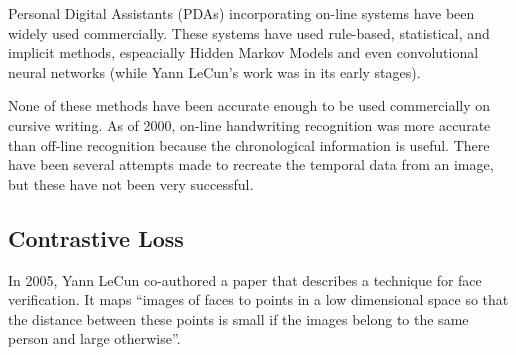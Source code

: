 Personal Digital Assistants (PDAs) incorporating on-line systems have been widely used commercially.
These systems have used rule-based, statistical, and implicit methods\cite{handwriting_survey}, espeacially Hidden Markov Models and even convolutional neural networks\cite{389575} (while Yann LeCun's work was in its early stages\cite{mnist}).

None of these methods have been accurate enough to be used commercially on cursive writing\cite{handwriting_survey}.
As of 2000, on-line handwriting recognition was more accurate than off-line recognition because the chronological information is useful\cite{handwriting_survey}.
There have been several attempts made to recreate the temporal data from an image, but these have not been very successful\cite{handwriting_survey}.



\subsection{Contrastive Loss}\label{sec:contrastive_loss}

In 2005, Yann LeCun co-authored a paper that describes a technique for face verification.
It maps ``images of faces to points in a low dimensional space so that the distance between these points is small if the images belong to the same person and large otherwise''\cite{LeCun}.


